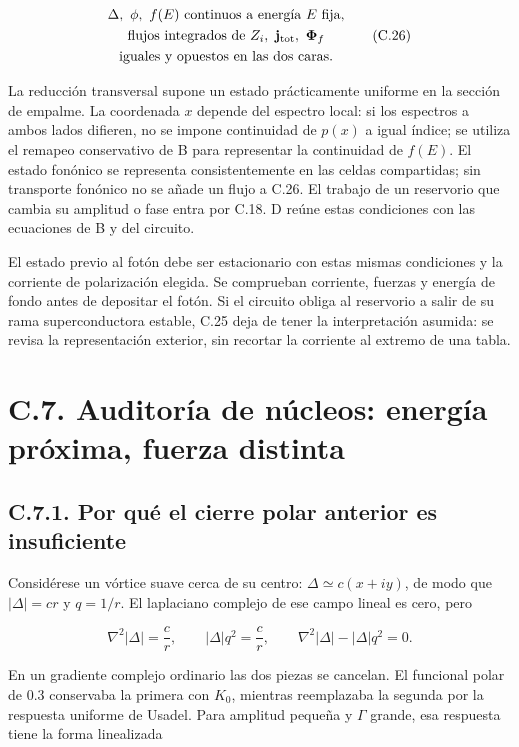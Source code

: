 \documentclass[
  spanish,
  10pt,
  a4paper,
]{article}
\begin{document}
\[
\begin{gathered}
\Delta,\ \phi,\ f(E)\ \text{continuos a energía }E\text{ fija},\\
\text{flujos integrados de }Z_i,\ \mathbf j_{\rm tot},\ \boldsymbol\Phi_f\\
\text{iguales y opuestos en las dos caras}.
\end{gathered}
\tag{C.26}
\]

La reducción transversal supone un estado prácticamente uniforme en la
sección de empalme. La coordenada \(x\) depende del espectro local: si
los espectros a ambos lados difieren, no se impone continuidad de
\(p(x)\) a igual índice; se utiliza el remapeo conservativo de B para
representar la continuidad de \(f(E)\). El estado fonónico se representa
consistentemente en las celdas compartidas; sin transporte fonónico no
se añade un flujo a C.26. El trabajo de un reservorio que cambia su
amplitud o fase entra por C.18. D reúne estas condiciones con las
ecuaciones de B y del circuito.

El estado previo al fotón debe ser estacionario con estas mismas
condiciones y la corriente de polarización elegida. Se comprueban
corriente, fuerzas y energía de fondo antes de depositar el fotón. Si el
circuito obliga al reservorio a salir de su rama superconductora
estable, C.25 deja de tener la interpretación asumida: se revisa la
representación exterior, sin recortar la corriente al extremo de una
tabla.

\section{C.7. Auditoría de núcleos: energía próxima, fuerza
distinta}\label{c.7.-auditoruxeda-de-nuxfacleos-energuxeda-pruxf3xima-fuerza-distinta}

\subsection{C.7.1. Por qué el cierre polar anterior es
insuficiente}\label{c.7.1.-por-quuxe9-el-cierre-polar-anterior-es-insuficiente}

Considérese un vórtice suave cerca de su centro:
\(\Delta\simeq c(x+iy)\), de modo que \(|\Delta|=cr\) y \(q=1/r\). El
laplaciano complejo de ese campo lineal es cero, pero

\[
\nabla^2|\Delta|=\frac{c}{r},\qquad |\Delta|q^2=\frac{c}{r},\qquad
\nabla^2|\Delta|-|\Delta|q^2=0.
\tag{C.27}
\]

En un gradiente complejo ordinario las dos piezas se cancelan. El
funcional polar de 0.3 conservaba la primera con \(K_0\), mientras
reemplazaba la segunda por la respuesta uniforme de Usadel. Para
amplitud pequeña y \(\Gamma\) grande, esa respuesta tiene la forma
linealizada
\end{document}

